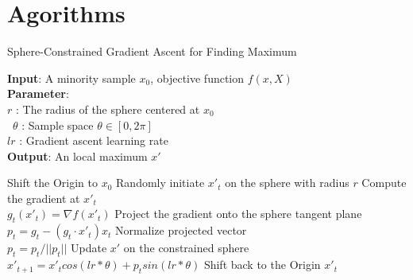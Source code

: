  



\section{Agorithms}
\label{apx.Agorithms}

\begin{algorithm}[ht]
	\caption{Sphere-Constrained Gradient Ascent for Finding Maximum}
	
	\begin{flushleft}
		\textbf{Input}: A minority sample $x_0$, objective function $f(x,X)$\\
		\textbf{Parameter}: \\
		$r$ : The radius of the sphere centered at $x_0$  \\\
		$\theta$ : Sample space $\theta \in [0,2\pi]$ \\
		$lr$ : Gradient ascent learning rate\\
		
		\textbf{Output}: An local maximum $x'$\\
		\begin{algorithmic}[1]
			\STATE Shift the Origin to $x_0$
			\STATE Randomly initiate $x'_t$ on the sphere with radius $r$	
			\STATE Compute the gradient at $x'_t$\\
			$g_t(x'_t) = \nabla f(x'_t)$
			\STATE Project the gradient onto the sphere tangent plane\\
			$p_t = g_t - (g_t \cdot x'_t) x_t$
			\STATE Normalize projected vector\\
			$p_t = p_t/ ||p_t||$
			\STATE Update $x'$ on the constrained sphere \\
			$x'_{t+1} = x'_t cos(lr*\theta) + p_t sin (lr*\theta)$ 			
			\ENDWHILE
			\STATE Shift back to the Origin
			\RETURN $x'_t$
		\end{algorithmic}
	\end{flushleft}
	\label{alg:optimization}
\end{algorithm}



